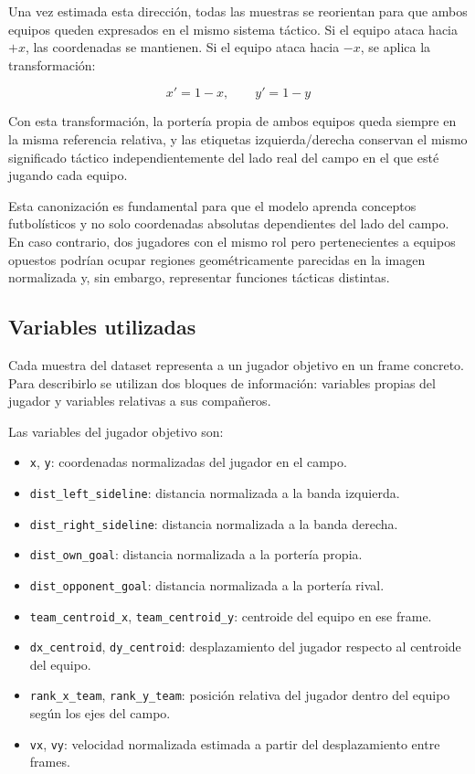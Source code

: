 Una vez estimada esta dirección, todas las muestras se reorientan para que ambos equipos queden expresados en el mismo sistema táctico. Si el equipo ataca hacia \(+x\), las coordenadas se mantienen. Si el equipo ataca hacia \(-x\), se aplica la transformación:

\[
x' = 1 - x, \qquad y' = 1 - y
\]

Con esta transformación, la portería propia de ambos equipos queda siempre en la misma referencia relativa, y las etiquetas izquierda/derecha conservan el mismo significado táctico independientemente del lado real del campo en el que esté jugando cada equipo.

Esta canonización es fundamental para que el modelo aprenda conceptos futbolísticos y no solo coordenadas absolutas dependientes del lado del campo. En caso contrario, dos jugadores con el mismo rol pero pertenecientes a equipos opuestos podrían ocupar regiones geométricamente parecidas en la imagen normalizada y, sin embargo, representar funciones tácticas distintas.


\subsection{Variables utilizadas}
\label{subsec:variables-inferencia-posicional}

Cada muestra del dataset representa a un jugador objetivo en un frame concreto. Para describirlo se utilizan dos bloques de información: variables propias del jugador y variables relativas a sus compañeros.

Las variables del jugador objetivo son:

\begin{itemize}
    \item \texttt{x}, \texttt{y}: coordenadas normalizadas del jugador en el campo.
    \item \texttt{dist\_left\_sideline}: distancia normalizada a la banda izquierda.
    \item \texttt{dist\_right\_sideline}: distancia normalizada a la banda derecha.
    \item \texttt{dist\_own\_goal}: distancia normalizada a la portería propia.
    \item \texttt{dist\_opponent\_goal}: distancia normalizada a la portería rival.
    \item \texttt{team\_centroid\_x}, \texttt{team\_centroid\_y}: centroide del equipo en ese frame.
    \item \texttt{dx\_centroid}, \texttt{dy\_centroid}: desplazamiento del jugador respecto al centroide del equipo.
    \item \texttt{rank\_x\_team}, \texttt{rank\_y\_team}: posición relativa del jugador dentro del equipo según los ejes del campo.
    \item \texttt{vx}, \texttt{vy}: velocidad normalizada estimada a partir del desplazamiento entre frames.
\end{itemize}

